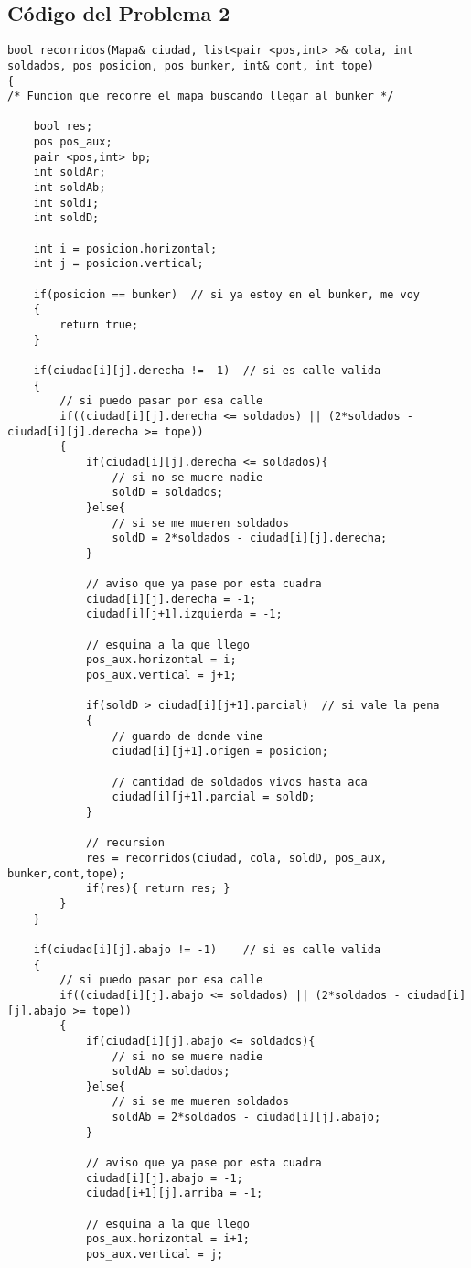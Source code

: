 \documentclass[a4paper]{article}
\begin{document}
\subsection{Código del Problema 2}

\begin{lstlisting}
bool recorridos(Mapa& ciudad, list<pair <pos,int> >& cola, int soldados, pos posicion, pos bunker, int& cont, int tope)
{
/* Funcion que recorre el mapa buscando llegar al bunker */
	
	bool res;
	pos pos_aux;
	pair <pos,int> bp;
	int soldAr;
	int soldAb;
	int soldI;
	int soldD;
	
	int i = posicion.horizontal;
	int j = posicion.vertical;
	
	if(posicion == bunker)	// si ya estoy en el bunker, me voy
	{
		return true;
	}
	
	if(ciudad[i][j].derecha != -1)	// si es calle valida
	{
		// si puedo pasar por esa calle
		if((ciudad[i][j].derecha <= soldados) || (2*soldados - ciudad[i][j].derecha >= tope))
		{
			if(ciudad[i][j].derecha <= soldados){
				// si no se muere nadie
				soldD = soldados;
			}else{
				// si se me mueren soldados
				soldD = 2*soldados - ciudad[i][j].derecha;
			}
			
			// aviso que ya pase por esta cuadra
			ciudad[i][j].derecha = -1;
			ciudad[i][j+1].izquierda = -1;
			
			// esquina a la que llego
			pos_aux.horizontal = i;
			pos_aux.vertical = j+1;
			
			if(soldD > ciudad[i][j+1].parcial)	// si vale la pena
			{
				// guardo de donde vine
				ciudad[i][j+1].origen = posicion;
				
				// cantidad de soldados vivos hasta aca
				ciudad[i][j+1].parcial = soldD;
			}
			
			// recursion
			res = recorridos(ciudad, cola, soldD, pos_aux, bunker,cont,tope);
			if(res){ return res; }
		}
	}
	
	if(ciudad[i][j].abajo != -1)	// si es calle valida
	{
		// si puedo pasar por esa calle
		if((ciudad[i][j].abajo <= soldados) || (2*soldados - ciudad[i][j].abajo >= tope))
		{
			if(ciudad[i][j].abajo <= soldados){
				// si no se muere nadie
				soldAb = soldados;
			}else{
				// si se me mueren soldados
				soldAb = 2*soldados - ciudad[i][j].abajo;
			}
				
			// aviso que ya pase por esta cuadra
			ciudad[i][j].abajo = -1;
			ciudad[i+1][j].arriba = -1;
			
			// esquina a la que llego
			pos_aux.horizontal = i+1;
			pos_aux.vertical = j;
			

\end{lstlisting}
\end{document}
